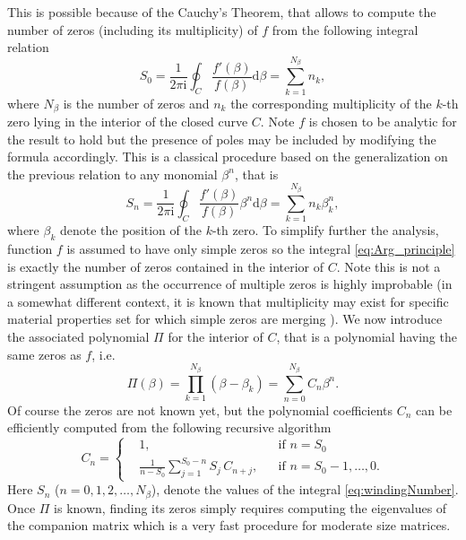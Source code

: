 \documentclass[a4paper,10pt]{article}
\newcommand{\ud}{\mathrm{d}}
\renewcommand{\i}{\mathrm{i}}
\begin{document}
This is possible because of the Cauchy's Theorem, that allows to compute the number of zeros (including its multiplicity) of $f$  from the following
integral relation
\begin{equation}
    \label{eq:Arg_principle}
 S_0 = \frac{1}{2\pi \i} \oint_C \frac{f'(\beta)}{f(\beta)}  \ud \beta =
 \sum_{k=1}^{N_\beta} n_{k},
\end{equation}
where $N_\beta$ is the number of zeros and $n_{k}$ the corresponding multiplicity of the $k$-th
zero lying in the interior of the closed curve $C$. Note $f$ is chosen to be analytic
for the result to hold but the presence of poles may be included
by modifying the formula accordingly.
This is a classical procedure based
on the generalization on the previous relation to any monomial $\beta^n$, that is
~\cite{Kravanja:2000}
\begin{equation}
    \label{eq:windingNumber}
S_n = \frac{1}{2\pi \i} \oint_C \frac{f'(\beta)}{f(\beta)} \beta^n \ud \beta =
 \sum_{k=1}^{N_\beta} n_{k} \beta_{k}^n,
\end{equation}
where $\beta_{k}$ denote the position of the $k$-th zero.
To simplify further the analysis, function $f$ is assumed to
have only simple zeros so the integral \eqref{eq:Arg_principle} is exactly the number of zeros contained in the interior of $C$. Note this is not a stringent assumption as the occurrence of multiple zeros is highly improbable
(in a somewhat different context, it is known that multiplicity may exist
for specific material properties set for which simple zeros are merging \cite{Nilsson:1980,Bloch3D:20107}).
We now introduce the associated polynomial $\Pi$ for the interior of $C$, that is
a polynomial having the same zeros as $f$, i.e.
\begin{equation}
\label{eq:Pi}
    \Pi(\beta) = \prod_{k=1}^{N_\beta} ( \beta - \beta_{k}) = \sum_{n=0}^{N_\beta} C_n \beta^n.
\end{equation}
Of course the zeros are not known yet, but the polynomial coefficients $C_n$
can be efficiently computed from the following recursive algorithm~\cite{Cristini:1994,Chen:2000}
\begin{equation}
    \label{eq:Cn}
    C_n = \left\{ \begin{aligned}
    &1, &        & \text{if } n=S_0\\
  &\frac{1}{n-S_0}\sum_{j=1}^{S_0-n} S_j \,  C_{n+j},     &   & \text{if } n = S_0-1, \ldots, 0.
    \end{aligned} \right.
\end{equation}
Here $S_n$ ($n=0,1,2,\ldots,N_\beta$), denote the values of the integral \eqref{eq:windingNumber}.
Once $\Pi$ is known, finding its zeros simply requires computing  the eigenvalues of the companion matrix which is a very fast procedure for moderate size matrices.
\end{document}
